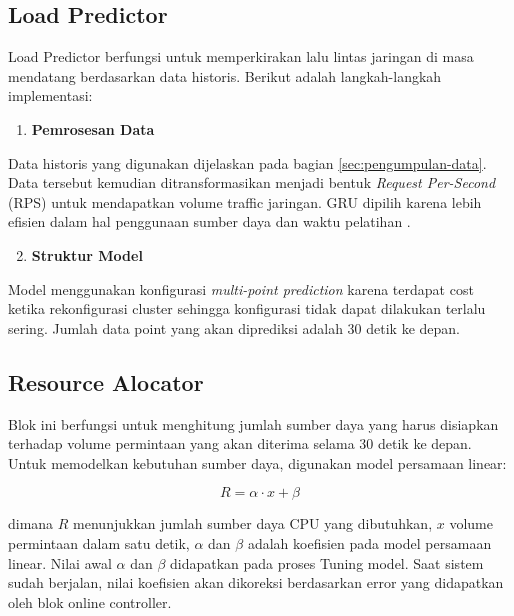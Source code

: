 \subsection{Load Predictor}
\label{sec:load-predictor}

Load Predictor berfungsi untuk memperkirakan lalu lintas jaringan di masa mendatang berdasarkan data historis. Berikut adalah langkah-langkah implementasi:

\begin{enumerate}
    \item \textbf{Pemrosesan Data}
\end{enumerate}

Data historis yang digunakan dijelaskan pada bagian \ref{sec:pengumpulan-data}. Data tersebut kemudian ditransformasikan menjadi bentuk \emph{Request Per-Second} (RPS) untuk mendapatkan volume traffic jaringan. GRU dipilih karena lebih efisien dalam hal penggunaan sumber daya dan waktu pelatihan \citep{mondal2023toward}.

\begin{enumerate}
    \setcounter{enumi}{1}
    \item \textbf{Struktur Model}
\end{enumerate}

Model menggunakan konfigurasi \emph{multi-point prediction} karena terdapat cost ketika rekonfigurasi cluster sehingga konfigurasi tidak dapat dilakukan terlalu sering. Jumlah data point yang akan diprediksi adalah 30 detik ke depan.

\subsection{Resource Alocator}
\label{sec:resource-alocator}

Blok ini berfungsi untuk menghitung jumlah sumber daya yang harus disiapkan terhadap volume permintaan yang akan diterima selama 30 detik ke depan. Untuk memodelkan kebutuhan sumber daya, digunakan model persamaan linear:

\begin{equation}
    R = \alpha \cdot x + \beta
    \label{eq:resource-model}
\end{equation}

dimana $R$ menunjukkan jumlah sumber daya CPU yang dibutuhkan, $x$ volume permintaan dalam satu detik, $\alpha$ dan $\beta$ adalah koefisien pada model persamaan linear. Nilai awal $\alpha$ dan $\beta$ didapatkan pada proses Tuning model. Saat sistem sudah berjalan, nilai koefisien akan dikoreksi berdasarkan error yang didapatkan oleh blok online controller.

